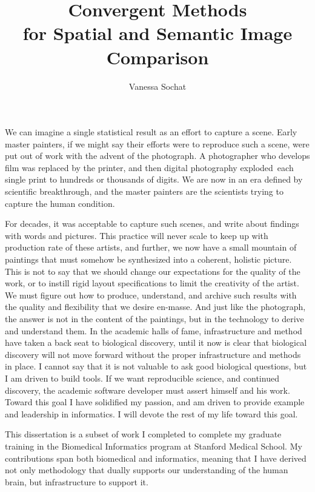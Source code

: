 \documentclass{report}
\begin{document}
\title{Convergent Methods\\
            for Spatial and Semantic Image Comparison}
\author{Vanessa Sochat}
\onlinetrue
 
\beforepreface
{}
We can imagine a single statistical result as an effort to capture a
scene. Early master painters, if we might say their efforts were to
reproduce such a scene, were put out of work with the advent of the
photograph. A photographer who develops film was replaced by the
printer, and then digital photography exploded~each single print to
hundreds or thousands of digits. We are now in an era defined by
scientific breakthrough, and the master painters are the scientists
trying to capture the human condition.

For decades, it was acceptable to capture such scenes, and write about
findings with words and pictures. This practice will never scale to keep
up with production rate of these artists, and further, we now have a
small mountain of paintings that must somehow be synthesized into a
coherent, holistic picture. This is not to say that we should change our
expectations for the quality of the work, or to instill rigid layout
specifications to limit the creativity of the artist. We must figure out
how to produce, understand, and archive such results with the quality
and flexibility that we desire en-masse. And just like the photograph,
the answer is not in the content of the paintings, but in the technology
to derive and understand them. In the academic halls of fame,
infrastructure and method have taken a back seat to biological
discovery, until it now is clear that biological discovery will not move
forward without the proper infrastructure and methods in place. I cannot
say that it is not valuable to ask good biological questions, but I am
driven to build tools. If we want reproducible science, and continued
discovery, the academic software developer must assert himself and his
work. Toward this goal I have solidified my passion, and am driven to
provide example and leadership in informatics. I will devote the rest of
my life toward this goal.

This dissertation is a subset of work I completed to complete my
graduate training in the Biomedical Informatics program at Stanford
Medical School. My contributions span both biomedical and informatics,
meaning that I have derived not only methodology that dually supports
our understanding of the human brain, but infrastructure to support it.
\end{document}
